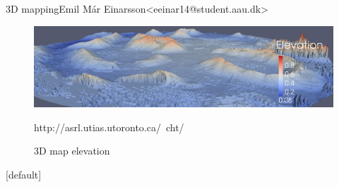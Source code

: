 \begin{frame}{3D mapping}{Emil Már Einarsson\newline<eeinar14@student.aau.dk>}
	\begin{figure}[h!]
    	\includegraphics[width=1\textwidth]{images/3dmap1.jpg}
    	\caption{3D map elevation}
    	\tiny{http://asrl.utias.utoronto.ca/~cht/}
		\centering    		
	\end{figure}
\end{frame}






[default]
